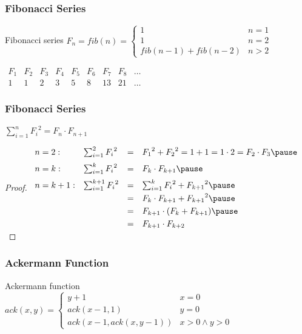 \documentclass[dvipsnames]{beamer}
\begin{document}
\begin{frame}
  \frametitle{Fibonacci Series}

  \begin{block}{Fibonacci series}
    $F_n = fib(n) = \left\{
      \begin{array}{ll}
        1                   & n = 1\\
        1                   & n = 2\\
        fib(n-1) + fib(n-2) & n > 2
      \end{array}
    \right.$
  \end{block}

  \bigskip
  $\begin{array}{ccccccccc}
     F_1 & F_2 & F_3 & F_4 & F_5 & F_6 & F_7 & F_8 & \dots\\
     1   & 1   & 2   & 3   & 5   & 8   & 13  & 21  & \dots
  \end{array}$
\end{frame}

\begin{frame}
  \frametitle{Fibonacci Series}

  \begin{theorem}
    $\sum_{i=1}^{n} {F_i}^2 = F_n \cdot F_{n+1}$
  \end{theorem}

  \pause
  \begin{proof}
    $\begin{array}{llcl}
      n=2:   & \sum_{i=1}^{2} {F_i}^2   & = & {F_1}^2+{F_2}^2=1+1=1 \cdot 2=F_2 \cdot F_3
      \pause
      \medskip\\
      n=k:   & \sum_{i=1}^{k} {F_i}^2   & = & F_k \cdot F_{k+1}
      \pause
      \medskip\\
      n=k+1: & \sum_{i=1}^{k+1} {F_i}^2 & = & \sum_{i=1}^{k} {F_i}^2 + {F_{k+1}}^2
      \pause
      \smallskip\\
             &                          & = & F_k \cdot F_{k+1} + {F_{k+1}}^2
      \pause
      \smallskip\\
             &                          & = & F_{k+1} \cdot (F_k + F_{k+1})
      \pause
      \smallskip\\
             &                          & = & F_{k+1} \cdot F_{k+2}
    \end{array}$
  \end{proof}
\end{frame}

\begin{frame}
  \frametitle{Ackermann Function}

  \begin{block}{Ackermann function}
    $ack(x,y) = \left\{
      \begin{array}{ll}
        y+1                 & x = 0\\
        ack(x-1, 1)         & y = 0\\
        ack(x-1,ack(x,y-1)) & x > 0 \wedge y > 0
      \end{array}
    \right.$
  \end{block}
\end{frame}
\end{document}
